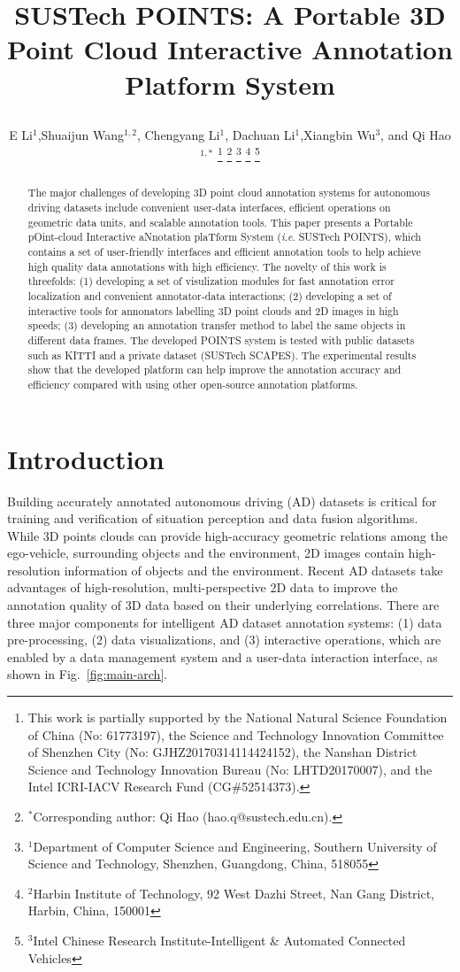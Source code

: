 \documentclass[letterpaper, 10 pt, conference]{ieeeconf}  %
\title{\LARGE \bf
SUSTech POINTS: A Portable 3D Point Cloud Interactive Annotation Platform System

}
\author{E Li$^{1}$,Shuaijun Wang$^{1,2}$,  Chengyang Li$^{1}$, Dachuan Li$^{1}$,Xiangbin Wu$^{3}$, and Qi Hao$^{1,*}$%
\thanks{This work is partially supported by the National Natural Science Foundation of China (No: 61773197), the Science and Technology Innovation Committee of Shenzhen City (No: GJHZ20170314114424152), the Nanshan District Science and Technology Innovation Bureau (No: LHTD20170007), and the Intel ICRI-IACV Research Fund (CG$\#$52514373).}
\thanks{$^{*}$Corresponding author: Qi Hao (hao.q@sustech.edu.cn).}
\thanks{$^{1}$Department of Computer Science and Engineering,
Southern University of Science and Technology, Shenzhen, Guangdong, China, 518055}
\thanks{$^{2}$Harbin Institute of Technology,
92 West Dazhi Street, Nan Gang District, Harbin, China, 150001}%
\thanks{$^{3}$Intel Chinese Research Institute-Intelligent \& Automated Connected Vehicles}%
}
\begin{document}
\maketitle
\thispagestyle{empty}
\pagestyle{empty}
\begin{abstract}

The major challenges of developing 3D point cloud annotation systems for autonomous driving datasets include
convenient user-data interfaces, efficient operations on geometric data units, and scalable annotation tools. 
This paper presents a {Portable pOint-cloud Interactive aNnotation plaTform System} (\textit{i}.\textit{e}. SUSTech POINTS), 
which contains a set of user-friendly interfaces and efficient annotation tools to help achieve high quality data annotations with high efficiency. 
The novelty of this work is threefolds: 
(1) developing a set of visulization modules for fast annotation error localization and convenient annotator-data interactions; 
(2) developing a set of interactive tools for annonators labelling 3D point clouds and 2D images in high speeds;
(3) developing an annotation transfer method to label the same objects in different data frames. 
The developed POINTS system is tested with public datasets such as KITTI and a private dataset (SUSTech SCAPES). 
The experimental results show that the developed platform can help improve the annotation accuracy and efficiency 
compared with using other open-source annotation platforms.



\end{abstract}






\section{Introduction}


Building accurately annotated autonomous driving (AD) datasets is critical for training and verification of situation perception and data fusion algorithms. 
While 3D points clouds can provide high-accuracy geometric relations among the ego-vehicle, surrounding objects and the environment, 
2D images contain high-resolution information of objects and the environment. 
Recent AD datasets take advantages of high-resolution, multi-perspective 2D data to improve the annotation quality of 3D data 
based on their underlying correlations. 
There are three major components for intelligent AD dataset annotation systems: 
(1) data pre-processing, (2) data visualizations, and (3) interactive operations, 
which are enabled by a data management system and a user-data interaction interface, as shown in Fig.~\ref{fig:main-arch}.
\end{document}
